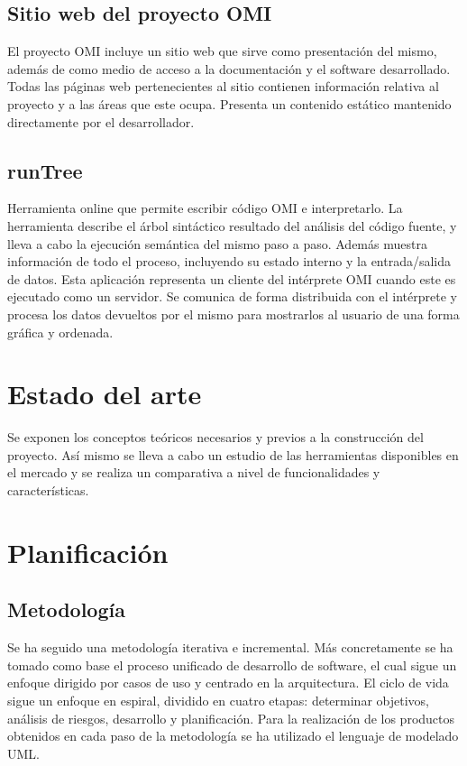 \subsection{Sitio web del proyecto OMI}
El proyecto OMI incluye un sitio web que sirve como presentación del mismo, además de como medio de acceso a la documentación 
y el software desarrollado. Todas las páginas web pertenecientes al sitio contienen información relativa al proyecto y a las áreas que este
ocupa. Presenta un contenido estático mantenido directamente por el desarrollador. 

\subsection{runTree}
Herramienta online que permite escribir código OMI e interpretarlo. La herramienta describe el árbol sintáctico resultado del análisis del código fuente, y lleva a cabo la ejecución
semántica del mismo paso a paso. Además muestra información de todo el proceso, incluyendo su estado interno y la entrada/salida de datos. 
Esta aplicación representa un cliente del intérprete OMI cuando este es ejecutado como un servidor. Se comunica de forma distribuida con el intérprete y procesa los datos devueltos por el mismo
para mostrarlos al usuario de una forma gráfica y ordenada.   

\section{Estado del arte}
Se exponen los conceptos teóricos necesarios y previos a la construcción del proyecto. Así mismo se lleva a cabo un estudio de las herramientas disponibles en el mercado y se realiza un comparativa a nivel de
funcionalidades y características. 

\section {Planificación}
\subsection{Metodología}
Se ha seguido una metodología iterativa e incremental. Más concretamente se ha tomado como
base el proceso unificado de desarrollo de software, el cual sigue un enfoque dirigido por casos de uso y centrado en 
la arquitectura. El ciclo de vida sigue un enfoque en espiral, dividido en cuatro etapas: determinar objetivos, análisis de riesgos, desarrollo y planificación.
Para la realización de los productos obtenidos en cada paso de la metodología se ha utilizado el lenguaje de modelado UML. 

